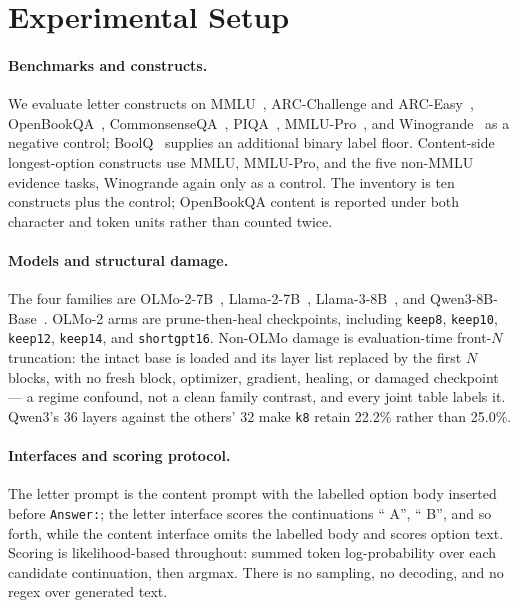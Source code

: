 \section{Experimental Setup}
\label{sec:setup}

\paragraph{Benchmarks and constructs.}
We evaluate letter constructs on MMLU~\citep{hendrycks2021measuring}, ARC-Challenge and ARC-Easy~\citep{clark2018think}, OpenBookQA~\citep{mihaylov2018openbookqa}, CommonsenseQA~\citep{talmor2019commonsenseqa}, PIQA~\citep{bisk2020piqa}, MMLU-Pro~\citep{wang2024mmlupro}, and Winogrande~\citep{sakaguchi2020winogrande} as a negative control; BoolQ~\citep{clark2019boolq} supplies an additional binary label floor. Content-side longest-option constructs use MMLU, MMLU-Pro, and the five non-MMLU evidence tasks, Winogrande again only as a control. The inventory is ten constructs plus the control; OpenBookQA content is reported under both character and token units rather than counted twice.

\paragraph{Models and structural damage.}
The four families are OLMo-2-7B~\citep{groeneveld2024olmo}, Llama-2-7B~\citep{touvron2023llama2}, Llama-3-8B~\citep{grattafiori2024llama3}, and Qwen3-8B-Base~\citep{yang2025qwen3}. OLMo-2 arms are prune-then-heal checkpoints, including \texttt{keep8}, \texttt{keep10}, \texttt{keep12}, \texttt{keep14}, and \texttt{shortgpt16}. Non-OLMo damage is evaluation-time front-$N$ truncation: the intact base is loaded and its layer list replaced by the first $N$ blocks, with no fresh block, optimizer, gradient, healing, or damaged checkpoint --- a regime confound, not a clean family contrast, and every joint table labels it. Qwen3's 36 layers against the others' 32 make \texttt{k8} retain 22.2\% rather than 25.0\%.

\paragraph{Interfaces and scoring protocol.}
The letter prompt is the content prompt with the labelled option body inserted before \texttt{Answer:}; the letter interface scores the continuations `` A'', `` B'', and so forth, while the content interface omits the labelled body and scores option text. Scoring is likelihood-based throughout: summed token log-probability over each candidate continuation, then argmax. There is no sampling, no decoding, and no regex over generated text.

